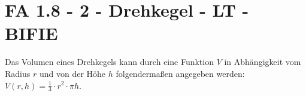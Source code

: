 \section{FA 1.8 - 2 - Drehkegel - LT - BIFIE}

\begin{beispiel}[FA 1.8]{1} %
Das Volumen eines Drehkegels kann durch eine Funktion $V$ in Abhängigkeit vom Radius $r$ und von der Höhe $h$ folgendermaßen angegeben werden: \mbox{$V(r,h)=\frac{1}{3}\cdot r^2\cdot \pi h$}.
\leer

\end{beispiel}
